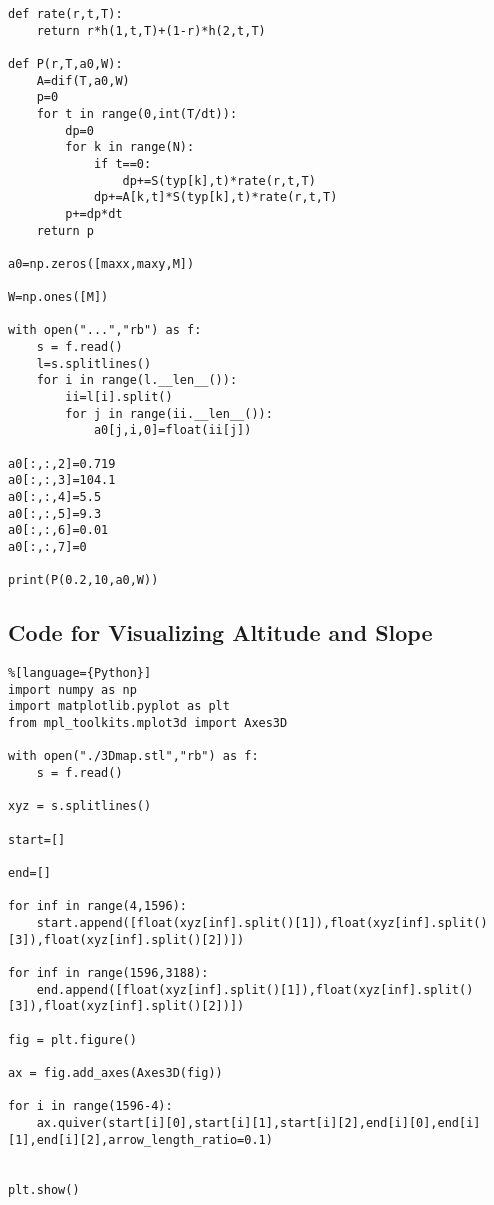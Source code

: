 \documentclass[./main.tex]{subfiles}
\begin{document}
\begin{spacing}
\begin{lstlisting}
def rate(r,t,T):
    return r*h(1,t,T)+(1-r)*h(2,t,T)

def P(r,T,a0,W):
    A=dif(T,a0,W)
    p=0
    for t in range(0,int(T/dt)):
        dp=0
        for k in range(N):
            if t==0:
                dp+=S(typ[k],t)*rate(r,t,T)
            dp+=A[k,t]*S(typ[k],t)*rate(r,t,T)
        p+=dp*dt
    return p

a0=np.zeros([maxx,maxy,M])

W=np.ones([M])

with open("...","rb") as f:
    s = f.read()
    l=s.splitlines()
    for i in range(l.__len__()):
        ii=l[i].split()
        for j in range(ii.__len__()):
            a0[j,i,0]=float(ii[j])

a0[:,:,2]=0.719
a0[:,:,3]=104.1
a0[:,:,4]=5.5
a0[:,:,5]=9.3
a0[:,:,6]=0.01
a0[:,:,7]=0

print(P(0.2,10,a0,W))
        \end{lstlisting}
    \end{spacing}

    \subsection{Code for Visualizing Altitude and Slope}
    \begin{spacing}
        \begin{lstlisting}%[language={Python}]
import numpy as np
import matplotlib.pyplot as plt
from mpl_toolkits.mplot3d import Axes3D

with open("./3Dmap.stl","rb") as f:
    s = f.read()

xyz = s.splitlines()

start=[]

end=[]

for inf in range(4,1596):
    start.append([float(xyz[inf].split()[1]),float(xyz[inf].split()[3]),float(xyz[inf].split()[2])])

for inf in range(1596,3188):
    end.append([float(xyz[inf].split()[1]),float(xyz[inf].split()[3]),float(xyz[inf].split()[2])])

fig = plt.figure()

ax = fig.add_axes(Axes3D(fig))

for i in range(1596-4):
    ax.quiver(start[i][0],start[i][1],start[i][2],end[i][0],end[i][1],end[i][2],arrow_length_ratio=0.1)


plt.show()
        \end{lstlisting}
    \end{spacing}
\end{document}
